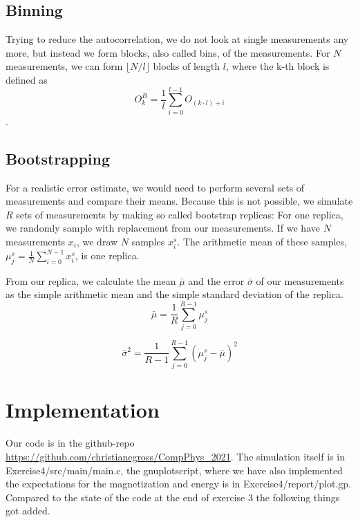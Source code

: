 \documentclass{scrartcl}
\begin{document}
\subsection{Binning}

Trying to reduce the autocorrelation, we do not look at single measurements any more, but instead we form blocks, also called bins, of the measurements. For $N$ measurements, we can form $\lfloor N/l \rfloor$ blocks of length $l$, where the k-th block is defined as \[O_k^B=\frac{1}{l}\sum_{i=0}^{l-1}O_{(k\cdot l)+i}\].

\subsection{Bootstrapping}


For a realistic error estimate, we would need to perform several sets of measurements and compare their means. Because this is not possible, we simulate $R$ sets of measurements by making so called bootstrap replicas: For one replica, we randomly sample with replacement from our measurements. If we have $N$ measurements $x_i$, we draw $N$ samples $x_i^s$. The arithmetic mean of these samples, $\mu^s_j=\frac{1}{N}\sum_{i=0}^{N-1}x_i^s$, is one replica.

From our replica, we calculate the mean $\bar{\mu}$ and the error $\bar{\sigma}$ of our measurements as the simple arithmetic mean and the simple standard deviation of the replica.
\[
\bar{\mu}=\frac{1}{R}\sum_{j=0}^{R-1}\mu^s_j\]


\[
\bar{\sigma}^2=\frac{1}{R-1}\sum_{j=0}^{R-1}(\mu^s_j-\bar{\mu})^2
\]

\section{Implementation}
Our code is in the github-repo \url{https://github.com/christianegross/CompPhys\_2021}. The simulation itself is in Exercise4/src/main/main.c, the gnuplotscript, where we have also implemented the expectations for the magnetization and energy is in Exercise4/report/plot.gp. Compared to the state of the code at the end of exercise 3 the following things got added. 
\end{document}
